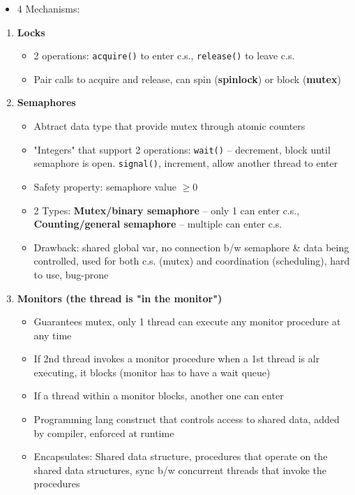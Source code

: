 \documentclass[10pt,landscape,a4paper]{article}
\begin{document}
\begin{multicols*}{4}
\begin{itemize}
\begin{enumerate}
          \end{enumerate}
    \item 4 Mechanisms:
  \end{itemize}
  \begin{enumerate}
    \item \textbf{Locks}
          \begin{itemize}
            \item 2 operations: \texttt{acquire()} to enter c.s., \texttt{release()} to leave c.s.
            \item Pair calls to acquire and release, can spin (\textbf{spinlock}) or block (\textbf{mutex})
          \end{itemize}
    \item \textbf{Semaphores}
          \begin{itemize}
            \item Abtract data type that provide mutex through atomic counters
            \item "Integers" that support 2 operations: \texttt{wait()} -- decrement, block until semaphore is open. \texttt{signal()}, increment, allow another thread to enter
            \item Safety property: semaphore value $\geq 0$
            \item 2 Types: \textbf{Mutex/binary semaphore} -- only 1 can enter c.s., \textbf{Counting/general semaphore} -- multiple can enter c.s.
            \item Drawback: shared global var, no connection b/w semaphore \& data being controlled, used for both c.s. (mutex) and coordination (scheduling), hard to use, bug-prone
          \end{itemize}
    \item \textbf{Monitors \textmd{(the thread is "in the monitor")}}
          \begin{itemize}
            \item Guarantees mutex, only 1 thread can execute any monitor procedure at any time
            \item If 2nd thread invokes a monitor procedure when a 1st thread is alr executing, it blocks (monitor has to have a wait queue)
            \item If a thread within a monitor blocks, another one can enter
            \item Programming lang construct that controls access to shared data, added by compiler, enforced at runtime
            \item Encapsulates: Shared data structure, procedures that operate on the shared data structures, sync b/w concurrent threads that invoke the procedures

\end{itemize}
\end{enumerate}
\end{multicols*}
\end{document}
